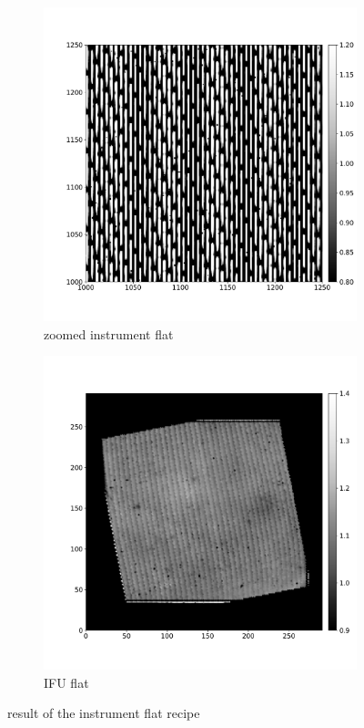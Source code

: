 \documentclass[twoside,single]{lion-msc}
\begin{document}
\begin{figure}[hb]
\centering
\begin{subfigure}{.5\textwidth}
  \centering
  \includegraphics[width=1\linewidth]{instrumentflat}
  \caption{zoomed instrument flat}
\end{subfigure}%
\begin{subfigure}{.5\textwidth}
  \centering
  \includegraphics[width=1\linewidth]{IFU_flat}
  \caption{IFU flat}
\end{subfigure}
\caption{result of the instrument flat recipe}
\label{fig:instrumentflatrecipe}
\end{figure}
\end{document}
